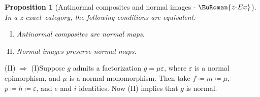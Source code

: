 \documentclass [12pt,oneside]{book}%
\makeatletter
\theoremstyle{captionstyle}  %
\newtheorem{proposition}[theorem]{Proposition}
\renewenvironment{proof}[1][\proofname]{\vspace{-2ex}\par       %
	\pushQED{\qed}%
	\normalfont \topsep6\p@\@plus6\p@\relax
	\trivlist
	\item[\hskip\labelsep
	            \color{proofcaption}\bfseries                %
	            #1\@addpunct{\quad}]\ignorespaces
}{%
	\popQED\endtrivlist\@endpefalse
}
\newenvironment{tfae}{		%
	\begin{enumerate}[(I)]}{
	\end{enumerate}
}
\newcommand{\DefEq}{\coloneq} 		%
\newcommand{\hy}{\text{-}}													%
\newcommand{\ZExact}{z-exact}									%
\newcommand{\ZExactTag}{ - {\color{Cerulean} $\EuRoman{z\hy Ex}$}}
\makeatother
\begin{document}
\begin{proposition}[Antinormal composites and normal images\ZExactTag]
    \label{thm:ANN<->NMNIC}%
    \label{thm:ANN<->NIPN}%
    In a \ZExact\ category, the following conditions are equivalent:
    \begin{tfae}
        \item Antinormal composites are normal maps.
        \item Normal images preserve normal maps.
    \end{tfae}
\end{proposition}
\begin{proof}
    (II) $\Rightarrow$ (I)\quad Suppose $g$ admits a factorization $g = \mu \varepsilon$, where $\varepsilon$ is a normal epimorphism, and $\mu$ is a normal monomorphism. Then take $f\DefEq m\DefEq \mu$, $p\DefEq h \DefEq \varepsilon$, and $e$ and $i$  identities. Now (II) implies that $g$ is normal.


\end{proof}
\end{document}
